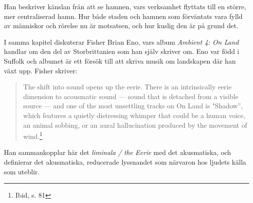 \documentclass{article}
\begin{document}
Han beskriver känslan från att se hamnen, vars verksamhet flyttats till en större, mer centraliserad hamn. 
Hur både staden och hamnen som förväntats vara fylld av människor och rörelse nu är motsatsen, och hur kuslig
den är på grund det.

I samma kapitel diskuterar Fisher Brian Eno, vars album \emph{Ambient 4: On Land} handlar om den del av
Storbrittanien som han själv skriver om. Eno var född i Suffolk och albumet är ett försök till att skriva
musik om landskapen där han växt upp. Fisher skriver: 

\begin{quote}
The shift into sound opens up the eerie. There is an intrinsically eerie dimension to acousmatic sound — sound
that is detached from a visible source — and one of the most unsettling tracks on On Land is "Shadow”, which
features a quietly distressing whimper that could be a human voice, an animal sobbing, or an aural
	hallucination produced by the movement of wind.\footnote{Ibid, s. 81}
\end{quote}

Han sammankopplar här det \emph{liminala / the Eerie} med det akusmatiska, och definierar det akusmatiska,
reducerade lyssnandet som närvaron hos ljudets källa som uteblir.














\end{document}

